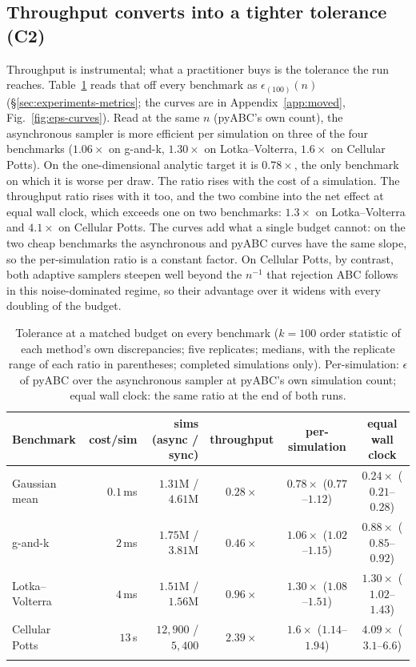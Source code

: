 \documentclass[pdflatex,sn-mathphys-num]{sn-jnl}
\theoremstyle{plain}
\theoremstyle{definition}
\begin{document}
\subsection{Throughput converts into a tighter tolerance (C2)}\label{sec:results-converts}

Throughput is instrumental; what a practitioner buys is the tolerance the run reaches. Table~\ref{tab:matched-eps} reads that off every benchmark as $\epsilon_{(100)}(n)$ (\S\ref{sec:experiments-metrics}; the curves are in Appendix~\ref{app:moved}, Fig.~\ref{fig:eps-curves}). Read at the same $n$ (pyABC's own count), the asynchronous sampler is more efficient per simulation on three of the four benchmarks ($1.06\times$ on g-and-k, $1.30\times$ on Lotka--Volterra, $1.6\times$ on Cellular Potts). On the one-dimensional analytic target it is $0.78\times$, the only benchmark on which it is worse per draw. The ratio rises with the cost of a simulation. The throughput ratio rises with it too, and the two combine into the net effect at equal wall clock, which exceeds one on two benchmarks: $1.3\times$ on Lotka--Volterra and $4.1\times$ on Cellular Potts. The curves add what a single budget cannot: on the two cheap benchmarks the asynchronous and pyABC curves have the same slope, so the per-simulation ratio is a constant factor. On Cellular Potts, by contrast, both adaptive samplers steepen well beyond the $n^{-1}$ that rejection ABC follows in this noise-dominated regime, so their advantage over it widens with every doubling of the budget.

\begin{table}[t]
\caption{Tolerance at a matched budget on every benchmark ($k=100$ order statistic of each method's own discrepancies; five replicates; medians, with the replicate range of each ratio in parentheses; completed simulations only). Per-simulation: $\epsilon$ of pyABC over the asynchronous sampler at pyABC's own simulation count; equal wall clock: the same ratio at the end of both runs.}\label{tab:matched-eps}
\centering
\footnotesize
\setlength{\tabcolsep}{4pt}
\begin{tabular}{@{}lrrccc@{}}
\toprule
Benchmark & cost/sim & sims (async / sync) & throughput & per-simulation & equal wall clock \\
\midrule
Gaussian mean   & $0.1$\,ms & $1.31$M / $4.61$M & $0.28\times$ & $0.78\times$ ($0.77$--$1.12$) & $0.24\times$ ($0.21$--$0.28$) \\
g-and-k         & $2$\,ms   & $1.75$M / $3.81$M & $0.46\times$ & $1.06\times$ ($1.02$--$1.15$) & $0.88\times$ ($0.85$--$0.92$) \\
Lotka--Volterra & $4$\,ms   & $1.51$M / $1.56$M & $0.96\times$ & $1.30\times$ ($1.08$--$1.51$) & $1.30\times$ ($1.02$--$1.43$) \\
Cellular Potts  & $13$\,s   & $12{,}900$ / $5{,}400$ & $2.39\times$ & $1.6\times$ ($1.14$--$1.94$) & $4.09\times$ ($3.1$--$6.6$) \\
\botrule
\end{tabular}
\end{table}
\end{document}
